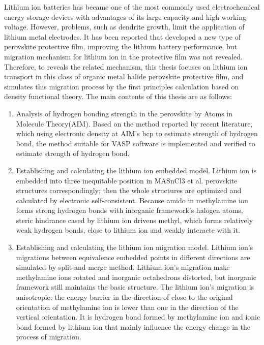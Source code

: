 \begin{eabstract}
Lithium ion batteries has became one of the most commonly used electrochemical energy storage devices with advantages of its large capacity and high working voltage. However, problems, such as dendrite growth, limit the application of lithium metal electrodes.
It has been reported that developed a new type of  perovskite protective film, improving the lithium battery performance, but migration mechanism for lithium ion in the protective film was not revealed.
Therefore, to reveals the related mechanism, this thesis focuses on lithium ion transport in this class of organic metal halide perovskite protective film, and simulates this migration process by the first principles calculation based on density functional theory.
The main contents of this thesis are as follows:
\begin{enumerate}
    \item Analysis of hydrogen bonding strength in the perovskite by Atoms in Molecule Theory(AIM). Based on the method reported by recent literature, which using electronic density at AIM's bcp to estimate strength of hydrogen bond, the method suitable for VASP software is implemented and verified to estimate strength of hydrogen bond.
    \item Establishing and calculating the lithium ion embedded model. Lithium ion is embedded into three inequitable position in MASnCl3 et al. perovskite structures correspondingly; then the whole structures are optimized and calculated by electronic self-consistent. Because amido in methylamine ion forms strong hydrogen bonds with inorganic framework's halogen atoms, steric hindrance cased by lithium ion drivens methyl, which forms relatively weak hydrogen bonds, close to lithium ion and weakly interacte with it.
    \item Establishing and calculating the lithium ion migration model. Lithium ion's migrations between equivalence embedded points in different directions are simulated by split-and-merge method. Lithium ion's migration make methylamine ions rotated and inorganic octahedrons distorted, but inorganic framework still  maintains the basic structure. The lithium ion's migration is anisotropic: the energy barrier in the direction of close to the original orientation of methylamine ion is lower than one in the direction of the vertical orientation. It is hydrogen bond formed by methylamine ion and ionic bond formed by lithium ion that mainly influence the energy change in the process of migration.
\end{enumerate}
\end{eabstract}